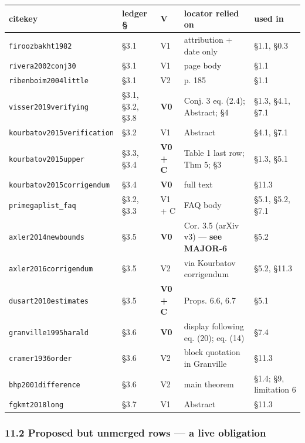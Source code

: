 \documentclass[
  a4paper,
  11pt]{article}
\begin{document}
\begin{longtable}[]{@{}lllll@{}}
\toprule\noalign{}
citekey & ledger § & V & locator relied on & used in \\
\midrule\noalign{}
\endhead
\bottomrule\noalign{}
\endlastfoot
\texttt{firoozbakht1982} & §3.1 & V1 & attribution + date only & §1.1,
§0.3 \\
\texttt{rivera2002conj30} & §3.1 & V1 & page body & §1.1 \\
\texttt{ribenboim2004little} & §3.1 & V2 & p. 185 & §1.1 \\
\texttt{visser2019verifying} & §3.1, §3.2, §3.8 & \textbf{V0} & Conj. 3
eq. (2.4); Abstract; §4 & §1.3, §4.1, §7.1 \\
\texttt{kourbatov2015verification} & §3.2 & V1 & Abstract & §4.1,
§7.1 \\
\texttt{kourbatov2015upper} & §3.3, §3.4 & \textbf{V0 + C} & Table 1
last row; Thm 5; §3 & §1.3, §5.1 \\
\texttt{kourbatov2015corrigendum} & §3.4 & \textbf{V0} & full text &
§11.3 \\
\texttt{primegaplist\_faq} & §3.2, §3.3 & V1 + C & FAQ body & §5.1,
§5.2, §7.1 \\
\texttt{axler2014newbounds} & §3.5 & \textbf{V0} & Cor. 3.5 (arXiv v3)
--- \textbf{see MAJOR-6} & §5.2 \\
\texttt{axler2016corrigendum} & §3.5 & V2 & via Kourbatov corrigendum &
§5.2, §11.3 \\
\texttt{dusart2010estimates} & §3.5 & \textbf{V0 + C} & Props. 6.6, 6.7
& §5.1 \\
\texttt{granville1995harald} & §3.6 & \textbf{V0} & display following
eq. (20); eq. (14) & §7.4 \\
\texttt{cramer1936order} & §3.6 & V2 & block quotation in Granville &
§11.3 \\
\texttt{bhp2001difference} & §3.6 & V2 & main theorem & §1.4; §9,
limitation 6 \\
\texttt{fgkmt2018long} & §3.7 & V1 & Abstract & §11.3 \\
\end{longtable}

\subsubsection{\texorpdfstring{11.2 Proposed but \textbf{unmerged} rows
--- a live
obligation}{11.2 Proposed but unmerged rows --- a live obligation}}\label{112-proposed-but-unmerged-rows--a-live-obligation}
\end{document}
